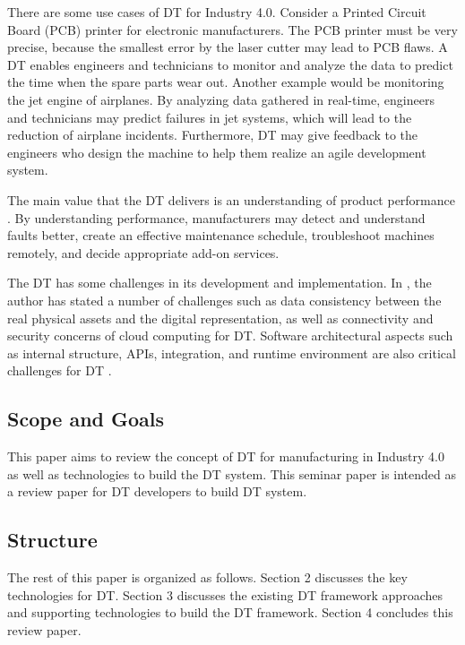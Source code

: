 \documentclass[article]{aaltoseries}
\begin{document}
There are some use cases of DT for Industry 4.0. Consider a Printed Circuit Board (PCB) printer for electronic manufacturers. The PCB printer must be very precise, because the smallest error by the laser cutter may lead to PCB flaws. A DT enables engineers and technicians to monitor and analyze the data to predict the time when the spare parts wear out. Another example would be monitoring the jet engine of airplanes. By analyzing data gathered in real-time, engineers and technicians may predict failures in jet systems, which will lead to the reduction of airplane incidents. Furthermore, DT may give feedback to the engineers who design the machine to help them realize an agile development system.

The main value that the DT delivers is an understanding of product performance \cite{Cheatshe3:online}. By understanding performance, manufacturers may detect and understand faults better, create an effective maintenance schedule, troubleshoot machines remotely, and decide appropriate add-on services.

The DT has some challenges in its development and implementation. In \cite{bienhaus2017patterns}, the author has stated a number of challenges such as data consistency between the real physical assets and the digital representation, as well as connectivity and security concerns of cloud computing for DT. Software architectural aspects such as internal structure, APIs, integration, and runtime environment are also critical challenges for DT \cite{malakuti2018architectural}.

\subsection{Scope and Goals}
\label{sec:emphasis}
This paper aims to review the concept of DT for manufacturing in Industry 4.0 as well as technologies to build the DT system. This seminar paper is intended as a review paper for DT developers to build DT system.

\subsection{Structure}
\label{sec:em}
The rest of this paper is organized as follows. Section 2 discusses the key technologies for DT. Section 3 discusses the existing DT framework approaches and supporting technologies to build the DT framework. Section 4 concludes this review paper.
 

\end{document}
